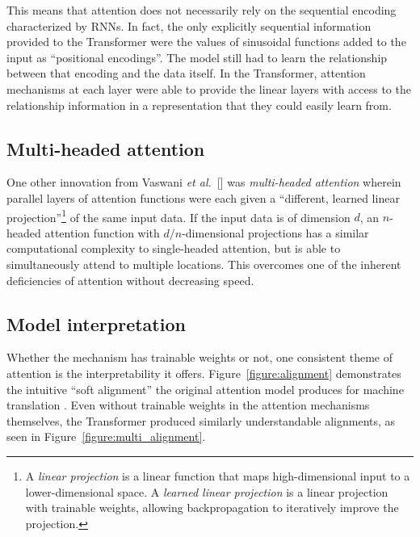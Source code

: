\documentclass{article}
\newcommand{\etal}{\textit{et al.}}
\begin{document}
This means that attention does not necessarily rely on the sequential encoding characterized by RNNs. In fact, the only explicitly sequential information provided to the Transformer were the values of sinusoidal functions added to the input as ``positional encodings''. The model still had to learn the relationship between that encoding and the data itself. In the Transformer, attention mechanisms at each layer were able to provide the linear layers with access to the relationship information in a representation that they could easily learn from.

\subsection{Multi-headed attention}\label{section:multi_headed}

One other innovation from Vaswani \etal~[\citeyear{attn_all_you_need}] was \textit{multi-headed attention} wherein parallel layers of attention functions were each given a ``different, learned linear projection''\footnote{A \textit{linear projection} is a linear function that maps high-dimensional input to a lower-dimensional space. A \textit{learned linear projection} is a linear projection with trainable weights, allowing backpropagation to iteratively improve the projection.} of the same input data. If the input data is of dimension $d$, an $n$-headed attention function with $d/n$-dimensional projections has a similar computational complexity to single-headed attention, but is able to simultaneously attend to multiple locations. This overcomes one of the inherent deficiencies of attention without decreasing speed.

\subsection{Model interpretation}

Whether the mechanism has trainable weights or not, one consistent theme of attention is the interpretability it offers. Figure~\ref{figure:alignment} demonstrates the intuitive ``soft alignment'' the original attention model produces for machine translation \cite{joint_align_translate}. Even without trainable weights in the attention mechanisms themselves, the Transformer produced similarly understandable alignments, as seen in Figure~\ref{figure:multi_alignment}.
\end{document}
